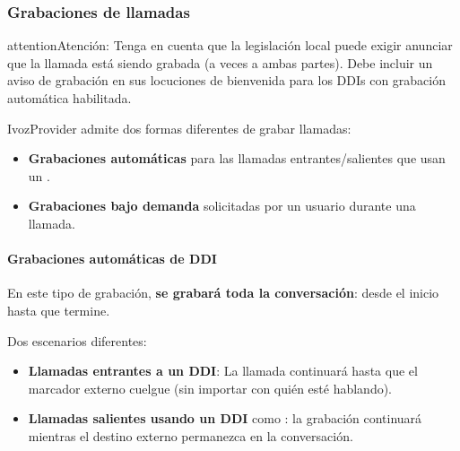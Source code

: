 \documentclass[letterpaper,10pt,spanish]{sphinxmanual}
\begin{document}
\subsubsection{Grabaciones de llamadas}
\label{administration_portal/client/vpbx/calls/call_recordings::doc}\label{administration_portal/client/vpbx/calls/call_recordings:call-recordings}\label{administration_portal/client/vpbx/calls/call_recordings:id1}
\begin{notice}{attention}{Atención:}
Tenga en cuenta que la legislación local puede exigir anunciar que la llamada está siendo grabada (a veces a ambas partes). Debe incluir un aviso de grabación en sus locuciones de bienvenida para los DDIs con grabación automática habilitada.
\end{notice}

IvozProvider admite dos formas diferentes de grabar llamadas:
\begin{itemize}
\item {} 
\textbf{Grabaciones automáticas} para las llamadas entrantes/salientes que usan un {\hyperref[administration_portal/brand/views/ddis:ddis]{}}.

\item {} 
\textbf{Grabaciones bajo demanda} solicitadas por un usuario durante una llamada.

\end{itemize}


\paragraph{Grabaciones automáticas de DDI}
\label{administration_portal/client/vpbx/calls/call_recordings:automatic-ddi-recordings}
En este tipo de grabación, \textbf{se grabará toda la conversación}: desde el inicio hasta que termine.

Dos escenarios diferentes:
\begin{itemize}
\item {} 
\textbf{Llamadas entrantes a un DDI}: La llamada continuará hasta que el marcador externo cuelgue (sin importar con quién esté hablando).

\item {} 
\textbf{Llamadas salientes usando un DDI} como {\hyperref[administration_portal/brand/views/ddis:ddis]{}}: la grabación continuará mientras el destino externo permanezca en la conversación.

\end{itemize}
\end{document}
